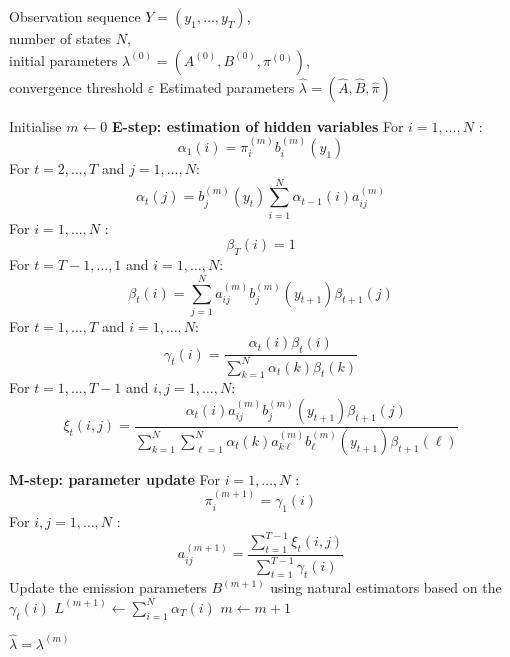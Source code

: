 \documentclass[11pt]{article}
\begin{document}
\begin{algorithm}[H]
\caption{Baum--Welch Algorithm}
\label{alg:baum-welch-standalone}
\small
\singlespacing
\setlength{\abovedisplayskip}{2pt}
\setlength{\belowdisplayskip}{2pt}
\setlength{\abovedisplayshortskip}{2pt}
\setlength{\belowdisplayshortskip}{2pt}
\begin{algorithmic}[1]
\Require 
Observation sequence \(Y=(y_1,\dots,y_T)\),\\
number of states \(N\), \\
initial parameters \(\lambda^{(0)}=(A^{(0)},B^{(0)},\pi^{(0)})\),\\
convergence threshold \(\varepsilon\)
\Ensure Estimated parameters \(\widehat{\lambda}=(\widehat{A},\widehat{B},\widehat{\pi})\)

\State Initialise \(m\gets 0\)
\Repeat
    \Statex
    \Statex \textbf{E-step: estimation of hidden variables}
    \State For \(i=1,\dots,N\) :
    \Statex \[
    \alpha_1(i)=\pi_i^{(m)}b_i^{(m)}(y_1)
    \]
    \State For \(t=2,\dots,T\) and \(j=1,\dots,N\):
    \Statex \[
    \alpha_t(j)
    =
    b_j^{(m)}(y_t)
    \sum_{i=1}^{N}\alpha_{t-1}(i)a_{ij}^{(m)}
    \]
    \State For \(i=1,\dots,N\) :
    \Statex \[
    \beta_T(i)=1
    \]
    \State For \(t=T-1,\dots,1\) and \(i=1,\dots,N\):
    \Statex \[
    \beta_t(i)
    =
    \sum_{j=1}^{N}
    a_{ij}^{(m)}b_j^{(m)}(y_{t+1})\beta_{t+1}(j)
    \]
    \State For \(t=1,\dots,T\) and \(i=1,\dots,N\):
    \Statex \[
    \gamma_t(i)
    =
    \frac{\alpha_t(i)\beta_t(i)}
    {\sum_{k=1}^{N}\alpha_t(k)\beta_t(k)}
    \]
    \State For \(t=1,\dots,T-1\) and \(i,j=1,\dots,N\):
    \Statex \[
    \xi_t(i,j)
    =
    \frac{
    \alpha_t(i)a_{ij}^{(m)}b_j^{(m)}(y_{t+1})\beta_{t+1}(j)
    }{
    \sum_{k=1}^{N}\sum_{\ell=1}^{N}
    \alpha_t(k)a_{k\ell}^{(m)}b_\ell^{(m)}(y_{t+1})\beta_{t+1}(\ell)
    }
    \]

    \Statex
    \Statex \textbf{M-step: parameter update}
    \State For \(i=1,\dots,N\) :
    \Statex \[
    \pi_i^{(m+1)}=\gamma_1(i)
    \]
    \State For \(i,j=1,\dots,N\) :
    \Statex \[
    a_{ij}^{(m+1)}
    =
    \frac{\sum_{t=1}^{T-1}\xi_t(i,j)}
    {\sum_{t=1}^{T-1}\gamma_t(i)}
    \]
    \State Update the emission parameters \(B^{(m+1)}\) using natural estimators based on the \(\gamma_t(i)\)
    \State \(\displaystyle L^{(m+1)}\gets \sum_{i=1}^{N}\alpha_T(i)\)
    \State \(m\gets m+1\)

\State \Return \(\widehat{\lambda}=\lambda^{(m)}\)
\end{algorithmic}
\end{algorithm}
\end{document}
